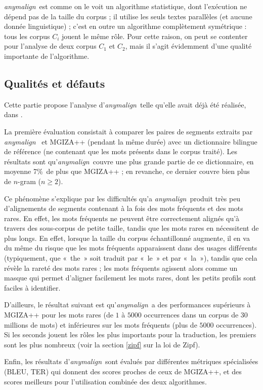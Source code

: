 \documentclass[a4paper,10pt]{article}
\newcommand{\anym}{\emph{anymalign}}
\newcommand{\guill}[1]{«~#1~»}
\begin{document}
\anym~est comme on le voit un algorithme statistique, dont l'exécution ne dépend pas de la taille du corpus ; il  utilise les seuls textes parallèles (et aucune donnée linguistique) ; c'est en outre un algorithme complètement symétrique : tous les corpus $C_i$ jouent le même rôle. Pour cette raison, on peut se contenter pour l'analyse de deux corpus $C_1$ et $C_2$, mais il s'agit évidemment d'une qualité importante de l'algorithme.


\subsection{Qualités et défauts}

Cette partie propose l'analyse d'\anym~telle qu'elle avait déjà été réalisée, dans \cite{lardilleux2013generalizing}.

La première évaluation consistait à comparer les paires de segments extraits par \anym~ et MGIZA++ (pendant la même durée) avec un dictionnaire bilingue de référence (ne contenant que les mots présents dans le corpus traité). Les résultats sont qu'\anym~couvre une plus grande partie de ce dictionnaire, en moyenne 7\%~de plus que MGIZA++ ; en revanche, ce dernier couvre bien plus de $n$-gram ($n\geq2$).

Ce phénomène s'explique par les difficultés qu'a \anym~produit très peu d'alignements de segments contenant à la fois des mots fréquents et des mots rares. En effet, les mots fréquents ne peuvent être correctement alignés qu'à travers des sous-corpus de petite taille, tandis que les mots rares en nécessitent de plus longs. En effet, lorsque la taille du corpus échantillonné augmente, il en va du même du risque que les mots fréquents apparaissent dans des usages différents (typiquement, que \guill{the} soit traduit par \guill{le} et par \guill{la}), tandis que cela révèle la rareté des mots rares ; les mots fréquents agissent alors comme un masque qui permet d'aligner facilement les mots rares, dont les petits profils sont faciles à identifier.

D'ailleurs, le résultat suivant est qu'\anym~a des performances supérieurs à MGIZA++ pour les mots rares (de $1$ à $5000$ occurrences dans un corpus de $30$ millions de mots) et inférieures sur les mots fréquents (plus de $5000$ occurrences). Si les seconds jouent les rôles les plus importants pour la traduction, les premiers sont les plus nombreux (voir la section \ref{zipf} sur la loi de Zipf).

Enfin, les résultats d'\anym~sont évalués par différentes métriques spécialisées (BLEU, TER) qui donnent des scores proches de ceux de MGIZA++, et des scores meilleurs pour l'utilisation combinée des deux algorithmes.
\end{document}
